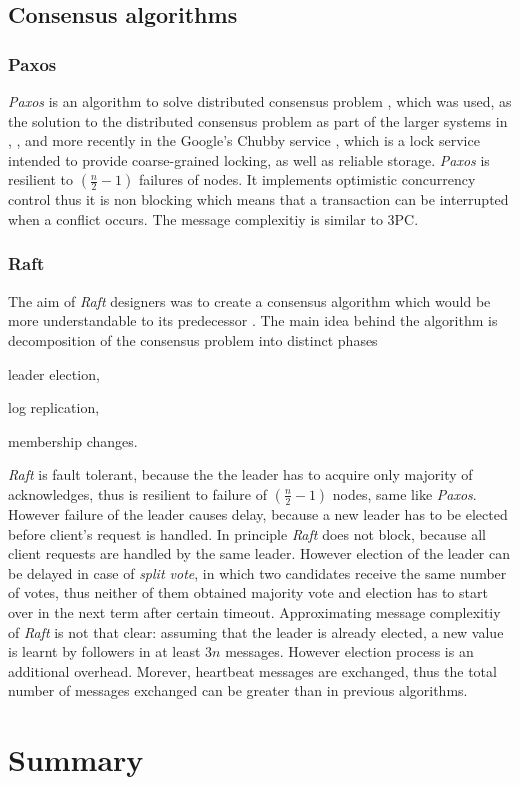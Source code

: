\documentclass[runningheads,a4paper]{llncs}
\newcommand{\paxos}{\emph{Paxos}\xspace}
\begin{document}
\subsection{Consensus algorithms}
\subsubsection{Paxos}
\paxos is an algorithm to solve distributed consensus problem 
\cite{Lamport1998partTimeParliment} \cite{lamport2001paxosMadeSimple}, which 
was used, as the solution to the distributed consensus problem as part of 
the larger systems in \cite{chandra2007PaxosMadeLive}, \cite{lampson1996build}, 
and more recently in the Google's Chubby service \cite{burrows2006chubby}, 
which is a lock service intended to provide coarse-grained locking, 
as well as reliable storage. \paxos is resilient to $(\frac{n}{2}-1)$
failures of nodes. It implements optimistic concurrency control thus it is 
non blocking which means that a transaction can be interrupted when a conflict 
occurs. The message complexitiy is similar to 3PC.

\subsubsection{Raft}
The aim of \emph{Raft} designers was to create a consensus algorithm which 
would be more understandable to its predecessor \cite{ongaro2014search}. 
The main idea behind the algorithm is decomposition of the consensus problem 
into distinct phases \begin{enumerate*}[label=\alph*)]
\item leader election,
\item log replication,
\item membership changes.
\end{enumerate*} 
\emph{Raft} is fault tolerant, because the the leader has to acquire only 
majority of acknowledges, thus is resilient to failure of $(\frac{n}{2}-1)$ 
nodes, same like \paxos. However failure of the leader causes delay, because 
a new leader has to be elected before client's request is handled.
In principle \emph{Raft} does not block, because all client requests are handled
by the same leader. However election of the leader can be delayed in case of
\emph{split vote}, in which two candidates receive the same number of votes,
thus neither of them obtained majority vote and election has to start over in
the next term after certain timeout. Approximating message complexitiy of \emph{Raft}
is not that clear: assuming that the leader is already elected, a new value 
is learnt by followers in at least $3n$ messages. However election process is 
an additional overhead. Morever, heartbeat messages are exchanged, thus the total 
number of messages exchanged can be greater than in previous algorithms.

\section{Summary}



 
\end{document}
